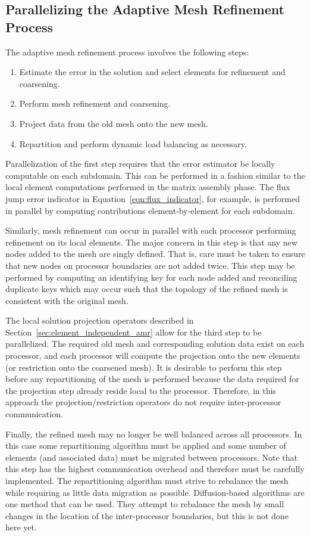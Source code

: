\subsection{Parallelizing the Adaptive Mesh Refinement Process}
The adaptive mesh refinement process involves the following steps:
\begin{enumerate}
  \tightlist
  \item Estimate the error in the solution and select elements for refinement and coarsening.
  \item Perform mesh refinement and coarsening.
  \item Project data from the old mesh onto the new mesh.
  \item Repartition and perform dynamic load balancing as necessary.
\end{enumerate}
Parallelization of the first step requires that the error estimator be locally computable on each subdomain.  This can be performed in a fashion similar to the local element computations performed in the matrix assembly phase.  The flux jump error indicator in Equation~\eqref{eqn:flux_indicator}, for example, is performed in parallel by computing contributions element-by-element for each subdomain.

Similarly, mesh refinement can occur in parallel with each processor performing refinement on its local elements.  The major concern in this step is that any new nodes added to the mesh are singly defined.  That is, care must be taken to ensure that new nodes on processor boundaries are not added twice.  This step may be performed by computing an identifying key for each node added and reconciling duplicate keys which may occur such that the topology of the refined mesh is consistent with the original mesh.

The local solution projection operators described in Section~\ref{sec:element_independent_amr} allow for the third step to be parallelized.  The required old mesh and corresponding solution data exist on each processor, and each processor will compute the projection onto the new elements (or restriction onto the coarsened mesh).  It is desirable to perform this step before any repartitioning of the mesh is performed because the data required for the projection step already reside local to the processor.  Therefore, in this approach the projection/restriction operators do not require inter-processor communication.

Finally, the refined mesh may no longer be well balanced across all processors.  In this case some repartitioning algorithm must be applied and some number of elements (and associated data) must be migrated between processors.  Note that this step has the highest communication overhead and therefore must be carefully implemented.  The repartitioning algorithm must strive to rebalance the mesh while requiring as little data migration as possible.  Diffusion-based algorithms are one method that can be used.  They attempt to rebalance the mesh by small changes in the location of the inter-processor boundaries, but this is not done here yet.


